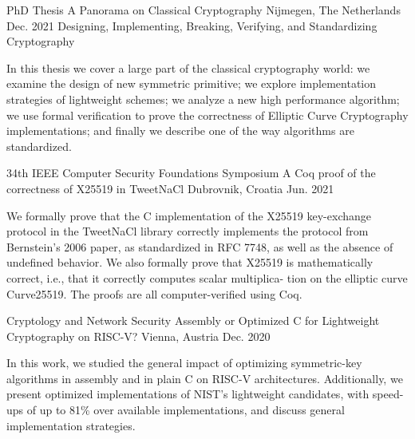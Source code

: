 {}


\begin{cventries}
	\cventrysix
	{PhD Thesis}
	{A Panorama on Classical Cryptography}
	{Nijmegen, The Netherlands} %
	{Dec. 2021} %
	{Designing, Implementing, Breaking, Verifying, and Standardizing Cryptography} %
	{
		\begin{cvitems} %
			\item {In this thesis we cover a large part of the classical cryptography world: we examine the design of new symmetric primitive; we explore implementation strategies of lightweight schemes; we analyze a new high performance algorithm; we use formal verification to prove the correctness of Elliptic Curve Cryptography implementations; and finally we describe one of the way algorithms are standardized.}
		\end{cvitems}
	}	%

	\cventry
	{34th IEEE Computer Security Foundations Symposium}
	{A Coq proof of the correctness of X25519 in TweetNaCl} %
	{Dubrovnik, Croatia} %
	{Jun. 2021} %
	{
		\begin{cvitems} %
			\item {We formally prove that the C implementation of the X25519
			            key-exchange protocol in the TweetNaCl library correctly implements the protocol from Bernstein’s 2006 paper, as standardized in RFC 7748, as well
			            as the absence of undefined behavior. We also formally prove that X25519 is mathematically correct, i.e., that it correctly computes scalar multiplica-
			            tion on the elliptic curve Curve25519. The proofs are all computer-verified using Coq.}
		\end{cvitems}
	}

	\cventry
	{Cryptology and Network Security}
	{Assembly or Optimized C for Lightweight Cryptography on RISC-V?} %
	{Vienna, Austria} %
	{Dec. 2020} %
	{
		\begin{cvitems} %
			\item {In this work, we studied the general impact of optimizing symmetric-key algorithms in assembly and in plain C on RISC-V architectures. Additionally, we present optimized implementations of NIST's lightweight candidates, with speed-ups of up to 81\% over available implementations, and discuss general implementation strategies.}
		\end{cvitems}
	}


\end{cventries}
